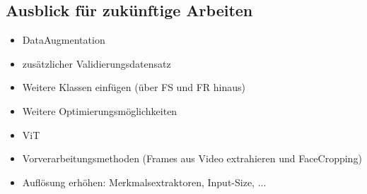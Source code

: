 \documentclass{article}
\begin{document}
    \subsection{Ausblick für zukünftige Arbeiten}
    \begin{itemize}
        \item DataAugmentation
        \item zusätzlicher Validierungsdatensatz %
        \item Weitere Klassen einfügen (über FS und FR hinaus)
        \item Weitere Optimierungsmöglichkeiten
        \item ViT
        \item Vorverarbeitungsmethoden (Frames aus Video extrahieren und FaceCropping)
        \item Auflösung erhöhen: Merkmalsextraktoren, Input-Size, ...
    \end{itemize}

    
    
\end{document}
